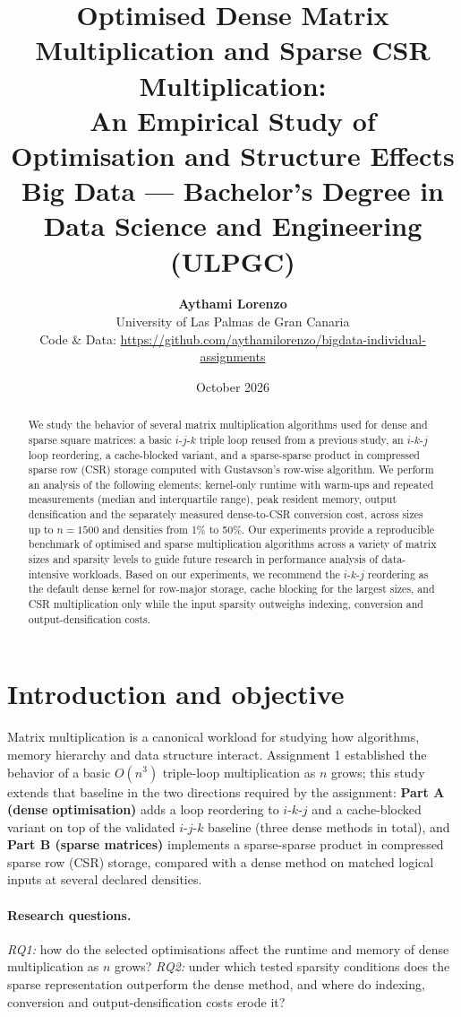 \documentclass[11pt,a4paper]{article}
\title{\textbf{Optimised Dense Matrix Multiplication and Sparse CSR
Multiplication:\\ An Empirical Study of Optimisation and Structure
Effects}\\
\vspace{0.5cm}
\Large Big Data --- Bachelor's Degree in Data Science and Engineering (ULPGC)}
\author{\textbf{Aythami Lorenzo} \\[0.1cm]
\small University of Las Palmas de Gran Canaria \\
\small Code \& Data: \url{https://github.com/aythamilorenzo/bigdata-individual-assignments}}
\date{October 2026}
\begin{document}
\maketitle

\begin{abstract}
We study the behavior of several matrix multiplication algorithms used for
dense and sparse square matrices: a basic $i$-$j$-$k$ triple loop reused from
a previous study, an $i$-$k$-$j$ loop reordering, a cache-blocked variant, and
a sparse-sparse product in compressed sparse row (CSR) storage computed with
Gustavson's row-wise algorithm. We perform an analysis of the following
elements: kernel-only runtime with warm-ups and repeated measurements
(median and interquartile range), peak resident memory, output densification
and the separately measured dense-to-CSR conversion cost, across sizes up to
$n = 1500$ and densities from 1\% to 50\%. Our experiments provide a
reproducible benchmark of
optimised and sparse multiplication algorithms across a variety of matrix
sizes and sparsity levels to guide future research in performance analysis of
data-intensive workloads. Based on our experiments, we recommend the $i$-$k$-$j$
reordering as the default dense kernel for row-major storage, cache blocking
for the largest sizes, and CSR multiplication only while the input sparsity
outweighs indexing, conversion and output-densification costs.
\end{abstract}

\newpage
\tableofcontents
\newpage

\section{Introduction and objective}
\label{sec:introduction}

Matrix multiplication is a canonical workload for studying how algorithms,
memory hierarchy and data structure interact. Assignment 1 established the
behavior of a basic $O(n^3)$ triple-loop multiplication as $n$ grows; this
study extends that baseline in the two directions required by the
assignment: \textbf{Part A (dense optimisation)} adds a loop reordering to
$i$-$k$-$j$ and a cache-blocked variant on top of the validated
$i$-$j$-$k$ baseline (three dense methods in total), and \textbf{Part B
(sparse matrices)} implements a sparse-sparse product in compressed sparse
row (CSR) storage, compared with a dense method on matched logical inputs at
several declared densities.

\paragraph{Research questions.}
\emph{RQ1:} how do the selected optimisations affect the runtime and memory of
dense multiplication as $n$ grows?
\emph{RQ2:} under which tested sparsity conditions does the sparse
representation outperform the dense method, and where do indexing, conversion
and output-densification costs erode it?
\end{document}
